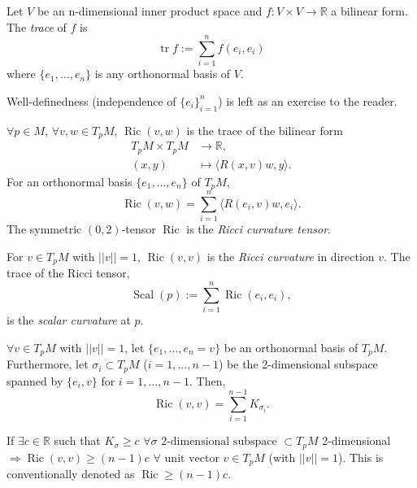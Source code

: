 \begin{definition}\label{def:9.5}
Let $V$ be an n-dimensional inner product space and $f:V\times V \to \mathbb{R}$ a bilinear form.
The \emph{trace} of $f$ is 
\[
\operatorname{tr} f := \sum_{i=1}^n f(e_i, e_i)
\]
where $\{e_1, \ldots, e_n\}$ is any orthonormal basis of $V$.
\end{definition}

\begin{remark}
Well-definedness (independence of $\{e_i\}_{i=1}^n$) is left as an exercise to the reader.
\end{remark}

\begin{definition}\label{def:9.6}
$\forall p \in M$, $\forall v,w \in T_pM$, $\operatorname{Ric}(v,w)$ is the trace of the bilinear form
\[
\begin{aligned}
T_pM \times T_pM &\to \mathbb{R}, \\
(x,y) &\mapsto \langle R(x,v)w, y\rangle.
\end{aligned}
\]
For an orthonormal basis $\{e_1, \ldots, e_n\}$ of $T_pM$,
\[
\operatorname{Ric}(v,w) = \sum_{i=1}^n \langle R(e_i, v)w, e_i\rangle.
\]
The symmetric $(0,2)$-tensor $\operatorname{Ric}$ is the \emph{Ricci curvature tensor}.

For $v \in T_pM$ with $||v||=1$, $\operatorname{Ric}(v,v)$ is the \emph{Ricci curvature} 
in direction $v$. The trace of the Ricci tensor,
\[
\operatorname{Scal}(p) := \sum_{i=1}^n \operatorname{Ric}(e_i, e_i),
\]
is the \emph{scalar curvature} at $p$.
\end{definition}

\begin{proposition}
\label{prop:9.7}
$\forall v \in T_pM$ with $||v|| = 1$, let $\{e_1, \dots, e_n=v\}$ be an orthonormal basis of $T_pM$. 
Furthermore, let $\sigma_i \subset T_pM$ ($i = 1, \dots, n-1$) be the 2-dimensional subspace spanned by $\{e_i, v\}$ for $i=1, \ldots, n-1$. Then,
\[
\operatorname{Ric}(v,v) = \sum_{i=1}^{n-1} K_{\sigma_i}.
\]
\end{proposition}

\begin{remark}
If $\exists c \in \mathbb{R}$ such that $K_{\sigma} \geq c$ $\forall \sigma \text{ 2-dimensional subspace }\subset T_pM$ 2-dimensional $\Rightarrow \operatorname{Ric}(v,v) \geq (n-1)c$ $\forall \text{ unit vector } v \in T_pM$ (with $||v||=1$).
This is conventionally denoted as $\operatorname{Ric} \geq (n-1)c$.
\end{remark}

